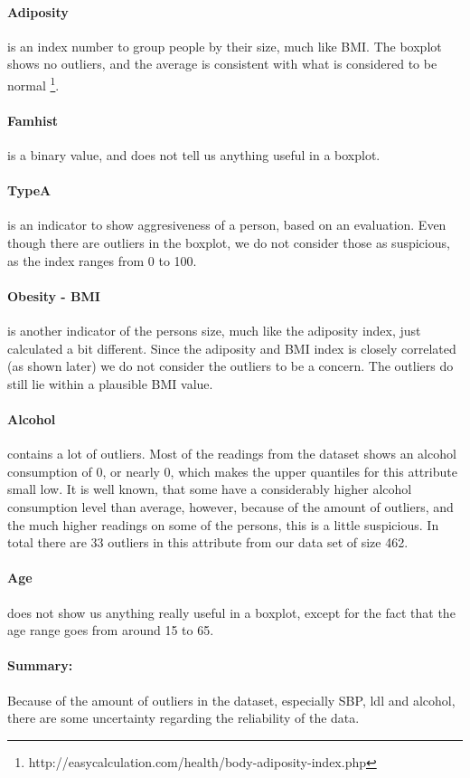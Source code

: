 \paragraph{Adiposity} is an index number to group people by their size, much like BMI. The boxplot shows no outliers, and the average is consistent with what is considered to be normal \footnote{http://easycalculation.com/health/body-adiposity-index.php}.

\paragraph{Famhist} is a binary value, and does not tell us anything useful in a boxplot.%

\paragraph{TypeA} is an indicator to show aggresiveness of a person, based on an evaluation. Even though there are outliers in the boxplot, we do not consider those as suspicious, as the index ranges from 0 to 100.

\paragraph{Obesity - BMI} is another indicator of the persons size, much like the adiposity index, just calculated a bit different. Since the adiposity and BMI index is closely correlated (as shown later) we do not consider the outliers to be a concern. The outliers do still lie within a plausible BMI value.

\paragraph{Alcohol} contains a lot of outliers. Most of the readings from the dataset shows an alcohol consumption of 0, or nearly 0, which makes the upper quantiles for this attribute small low. It is well known, that some have a considerably higher alcohol consumption level than average, however, because of the amount of outliers, and the much higher readings on some of the persons, this is a little suspicious.
In total there are 33 outliers in this attribute from our data set of size 462.

\paragraph{Age} does not show us anything really useful in a boxplot, except for the fact that the age range goes from around 15 to 65.

\paragraph{Summary:} Because of the amount of outliers in the dataset, especially SBP, ldl and alcohol, there are some uncertainty regarding the reliability of the data.

